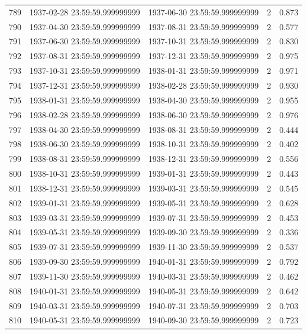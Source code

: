 \begin{table}
\begin{tabular}{lcccc}
789 & 1937-02-28 23:59:59.999999999 & 1937-06-30 23:59:59.999999999 & 2 & 0.873 \\
790 & 1937-04-30 23:59:59.999999999 & 1937-08-31 23:59:59.999999999 & 2 & 0.577 \\
791 & 1937-06-30 23:59:59.999999999 & 1937-10-31 23:59:59.999999999 & 2 & 0.830 \\
792 & 1937-08-31 23:59:59.999999999 & 1937-12-31 23:59:59.999999999 & 2 & 0.975 \\
793 & 1937-10-31 23:59:59.999999999 & 1938-01-31 23:59:59.999999999 & 2 & 0.971 \\
794 & 1937-12-31 23:59:59.999999999 & 1938-02-28 23:59:59.999999999 & 2 & 0.930 \\
795 & 1938-01-31 23:59:59.999999999 & 1938-04-30 23:59:59.999999999 & 2 & 0.955 \\
796 & 1938-02-28 23:59:59.999999999 & 1938-06-30 23:59:59.999999999 & 2 & 0.976 \\
797 & 1938-04-30 23:59:59.999999999 & 1938-08-31 23:59:59.999999999 & 2 & 0.444 \\
798 & 1938-06-30 23:59:59.999999999 & 1938-10-31 23:59:59.999999999 & 2 & 0.402 \\
799 & 1938-08-31 23:59:59.999999999 & 1938-12-31 23:59:59.999999999 & 2 & 0.556 \\
800 & 1938-10-31 23:59:59.999999999 & 1939-01-31 23:59:59.999999999 & 2 & 0.443 \\
801 & 1938-12-31 23:59:59.999999999 & 1939-03-31 23:59:59.999999999 & 2 & 0.545 \\
802 & 1939-01-31 23:59:59.999999999 & 1939-05-31 23:59:59.999999999 & 2 & 0.628 \\
803 & 1939-03-31 23:59:59.999999999 & 1939-07-31 23:59:59.999999999 & 2 & 0.453 \\
804 & 1939-05-31 23:59:59.999999999 & 1939-09-30 23:59:59.999999999 & 2 & 0.336 \\
805 & 1939-07-31 23:59:59.999999999 & 1939-11-30 23:59:59.999999999 & 2 & 0.537 \\
806 & 1939-09-30 23:59:59.999999999 & 1940-01-31 23:59:59.999999999 & 2 & 0.792 \\
807 & 1939-11-30 23:59:59.999999999 & 1940-03-31 23:59:59.999999999 & 2 & 0.462 \\
808 & 1940-01-31 23:59:59.999999999 & 1940-05-31 23:59:59.999999999 & 2 & 0.642 \\
809 & 1940-03-31 23:59:59.999999999 & 1940-07-31 23:59:59.999999999 & 2 & 0.703 \\
810 & 1940-05-31 23:59:59.999999999 & 1940-09-30 23:59:59.999999999 & 2 & 0.723 \\

\end{tabular}
\end{table}
